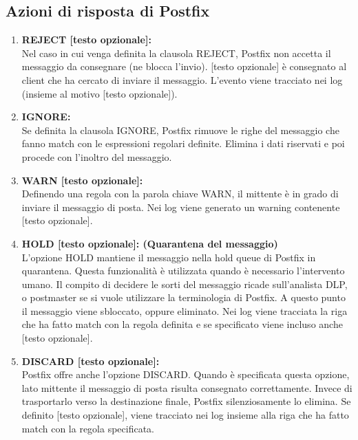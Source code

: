   \begin{table}[htp]
    \subsection{Azioni di risposta di Postfix}
  \begin{enumerate}[label=\textbf{\arabic*})]
      \item{\textbf{REJECT [testo opzionale]:}}\\
      Nel caso in cui venga definita la clausola REJECT, Postfix non accetta il messaggio 
      da consegnare (ne blocca l'invio).
      [testo opzionale] è consegnato al client che ha cercato di inviare il messaggio.
      L'evento viene tracciato nei log (insieme al motivo [testo opzionale]).
  
      \item{\textbf{IGNORE:}}\\
      Se definita la clausola IGNORE, Postfix rimuove le righe del messaggio che fanno match con 
      le espressioni regolari definite. Elimina i dati riservati e poi procede con l'inoltro del 
      messaggio.
      
      \item{\textbf{WARN [testo opzionale]:}}\\
      Definendo una regola con la parola chiave WARN, il mittente è in grado di inviare il messaggio di 
      posta. Nei log viene generato un warning contenente [testo opzionale].
      
      \item{\textbf{HOLD [testo opzionale]: (Quarantena del messaggio)}}\\
      L'opzione HOLD mantiene il messaggio nella hold queue di Postfix in quarantena. Questa funzionalità
      è utilizzata quando è necessario l'intervento umano. Il compito di decidere le sorti del messaggio
      ricade sull'analista DLP, o postmaster se si vuole utilizzare la terminologia di Postfix. A questo punto
      il messaggio viene sbloccato, oppure eliminato.
      Nei log viene tracciata la riga che ha fatto match con la regola definita e se specificato viene incluso
      anche [testo opzionale].
      
      
      \item{\textbf{DISCARD [testo opzionale]:}}\\
      Postfix offre anche l'opzione DISCARD. Quando è specificata questa opzione, lato mittente il 
      messaggio di posta risulta consegnato correttamente. Invece di trasportarlo verso la destinazione finale, 
      Postfix silenziosamente lo elimina.
      Se definito [testo opzionale], viene tracciato nei log insieme alla riga che ha fatto match con la regola 
      specificata. 
      

\end{enumerate}
\end{table}
